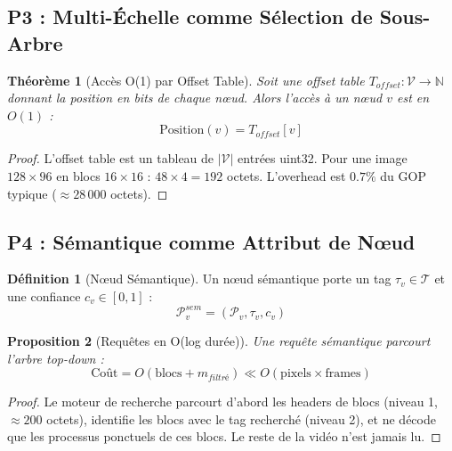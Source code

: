 \documentclass[12pt,a4paper]{article}
\newtheorem{theorem}{Théorème}[section]
\newtheorem{proposition}[theorem]{Proposition}
\theoremstyle{definition}
\newtheorem{definition}{Définition}[section]
\begin{document}
	\subsection{P3 : Multi-Échelle comme Sélection de Sous-Arbre}
	
	\begin{theorem}[Accès O(1) par Offset Table]
		\label{thm:acces_o1}
		Soit une offset table $T_{offset} : \mathcal{V} \to \mathbb{N}$ donnant la position en bits de chaque nœud. Alors l'accès à un nœud $v$ est en $O(1)$ :
		\begin{equation}
			\text{Position}(v) = T_{offset}[v]
		\end{equation}
	\end{theorem}
	
	\begin{proof}
		L'offset table est un tableau de $|\mathcal{V}|$ entrées uint32. Pour une image $128 \times 96$ en blocs $16 \times 16$ : $48 \times 4 = 192$ octets. L'overhead est $0.7\%$ du GOP typique ($\approx 28\,000$ octets).
	\end{proof}
	
	\subsection{P4 : Sémantique comme Attribut de Nœud}
	
	\begin{definition}[Nœud Sémantique]
		\label{def:noeud_semantique}
		Un nœud sémantique porte un tag $\tau_v \in \mathcal{T}$ et une confiance $c_v \in [0,1]$ :
		\begin{equation}
			\mathcal{P}_v^{sem} = (\mathcal{P}_v, \tau_v, c_v)
		\end{equation}
	\end{definition}
	
	\begin{proposition}[Requêtes en O(log durée)]
		\label{prop:requetes_semantiques}
		Une requête sémantique parcourt l'arbre top-down :
		\begin{equation}
			\text{Coût} = O(\text{blocs} + m_{filtré}) \ll O(\text{pixels} \times \text{frames})
		\end{equation}
	\end{proposition}
	
	\begin{proof}
		Le moteur de recherche parcourt d'abord les headers de blocs (niveau 1, $\approx 200$ octets), identifie les blocs avec le tag recherché (niveau 2), et ne décode que les processus ponctuels de ces blocs. Le reste de la vidéo n'est jamais lu.
	\end{proof}
	
\end{document}
